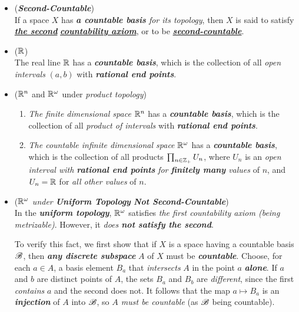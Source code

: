 \documentclass[11pt]{article}
\begin{document}
\begin{itemize}
\item \begin{definition} (\emph{\textbf{Second-Countable}})\\
If a space $X$ has \emph{\textbf{a countable basis} for its topology}, then $X$ is said to satisfy \underline{\emph{\textbf{the second}}} \underline{\emph{\textbf{countability axiom}}}, or to be \underline{\emph{\textbf{second-countable}}}.
\end{definition}

\item \begin{example} (${\mathbb R}$)\\
The real line ${\mathbb R}$ has a \emph{\textbf{countable basis}}, which is the collection of all \emph{open intervals} $(a, b)$ with \emph{\textbf{rational end points}}.
\end{example}

\item \begin{example} (${\mathbb R}^n$ and ${\mathbb R}^{\omega}$ under \emph{product topology})
\begin{enumerate}
\item \emph{The finite dimensional space} ${\mathbb R}^n$ has a \emph{\textbf{countable basis}}, which is the collection of all \emph{product of intervals}  with \emph{\textbf{rational end points}}.
\item \emph{The countable infinite dimensional space} ${\mathbb R}^\omega$ has a \emph{\textbf{countable basis}}, which is the
collection of all products $\prod_{n\in {\mathbb Z}_{+}} U_n$, where $U_n$ is an \emph{open interval with \textbf{rational end points}} \emph{for \textbf{finitely many} values} of $n$, and $U_n = {\mathbb R}$ for \emph{all other values} of $n$.
\end{enumerate}
\end{example}

\item \begin{example}  (\emph{${\mathbb R}^{\omega}$ under \textbf{Uniform Topology} \textbf{Not Second-Countable}})\\
In the \emph{\textbf{uniform topology}}, ${\mathbb R}^{\omega}$ satisfies \emph{the first countability axiom (being metrizable)}. However, it \emph{does \textbf{not satisfy the second}}. 

To verify this fact, we first show that if $X$ is a space having a countable basis ${\mathscr B}$, then \emph{\textbf{any discrete subspace}} $A$ of $X$ must be \emph{\textbf{countable}}. Choose, for each $a \in A$, a basis element $B_a$ that \emph{intersects} $A$ in the point $a$ \emph{\textbf{alone}}. If $a$ and $b$ are distinct points of $A$, the sets $B_a$ and $B_b$ are \emph{different}, since the first \emph{contains} $a$ and the second does not. It follows that the map $a \mapsto
 B_a$ is an \emph{\textbf{injection}} of $A$ into ${\mathscr B}$, so \emph{$A$ must be countable} (as ${\mathscr B}$ being countable).
 

\end{example}
\end{itemize}
\end{document}

